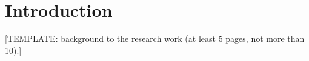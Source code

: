 \chapter{Introduction}

[TEMPLATE:  background to the research work (at least 5 pages, not more
than 10).]

\cite{hariboss}